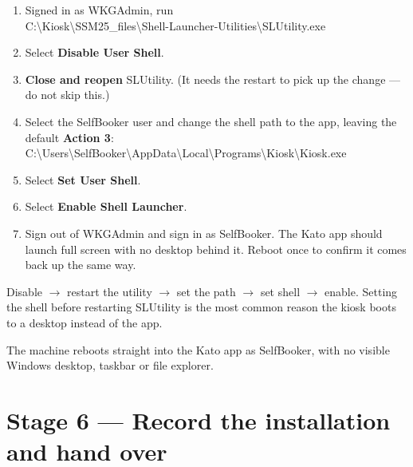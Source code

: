 \documentclass[a4paper,10pt]{article}
\newcommand{\wpath}[1]{{\ttfamily\small #1}}
\begin{document}
\begin{enumerate}
  \item Signed in as \wpath{WKGAdmin}, run\\
        \wpath{C:\textbackslash Kiosk\textbackslash SSM25\_files\textbackslash Shell-Launcher-Utilities\textbackslash SLUtility.exe}

  \item Select \textbf{Disable User Shell}.

  \item \textbf{Close and reopen} \wpath{SLUtility}. (It needs the
        restart to pick up the change --- do not skip this.)

  \item Select the \wpath{SelfBooker} user and change the shell path to
        the app, leaving the default \textbf{Action 3}:\\
        \wpath{C:\textbackslash Users\textbackslash SelfBooker\textbackslash AppData\textbackslash Local\textbackslash Programs\textbackslash Kiosk\textbackslash Kiosk.exe}

  \item Select \textbf{Set User Shell}.

  \item Select \textbf{Enable Shell Launcher}.

  \item Sign out of \wpath{WKGAdmin} and sign in as \wpath{SelfBooker}.
        The Kato app should launch full screen with no desktop behind
        it. Reboot once to confirm it comes back up the same way.
\end{enumerate}

\begin{wkwarn}
Disable $\rightarrow$ restart the utility $\rightarrow$ set the path
$\rightarrow$ set shell $\rightarrow$ enable. Setting the shell before
restarting \wpath{SLUtility} is the most common reason the kiosk boots to
a desktop instead of the app.
\end{wkwarn}

\begin{wkinfo}
The machine reboots straight into the Kato app as \wpath{SelfBooker},
with no visible Windows desktop, taskbar or file explorer.
\end{wkinfo}

\section{Stage 6 --- Record the installation and hand over}
\end{document}
